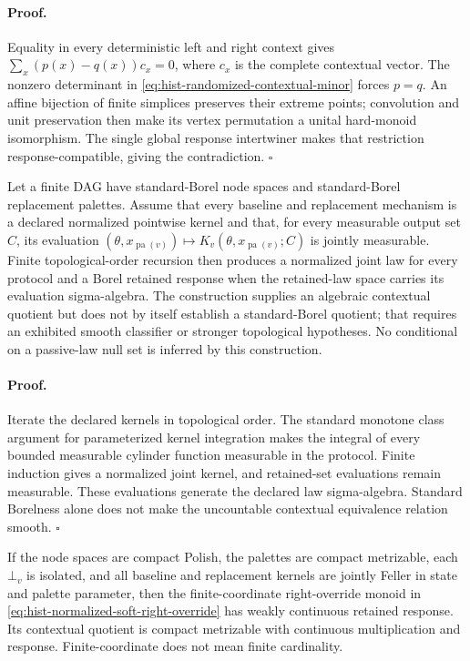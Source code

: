 \paragraph{Proof.}
Equality in every deterministic left and right context gives
\(\sum_x(p(x)-q(x))c_x=0\), where \(c_x\) is the complete contextual vector.
The nonzero determinant in
\eqref{eq:hist-randomized-contextual-minor} forces \(p=q\).  An affine
bijection of finite simplices preserves their extreme points; convolution
and unit preservation then make its vertex permutation a unital hard-monoid
isomorphism.  The single global response intertwiner makes that restriction
response-compatible, giving the contradiction.  \(\square\)

Let a finite DAG have standard-Borel node spaces and standard-Borel
replacement palettes.  Assume that every baseline and replacement mechanism
is a declared normalized pointwise kernel and that, for every measurable
output set \(C\), its evaluation
\((\theta,x_{\operatorname{pa}(v)})\mapsto
K_v(\theta,x_{\operatorname{pa}(v)};C)\) is jointly measurable.  Finite
topological-order recursion then produces a normalized joint law for every
protocol and a Borel retained response when the retained-law space carries
its evaluation sigma-algebra.  The construction supplies an algebraic
contextual quotient but does not by itself establish a standard-Borel
quotient; that requires an exhibited smooth classifier or stronger
topological hypotheses.  No conditional on a passive-law null set is inferred
by this construction.  

\paragraph{Proof.}
Iterate the declared kernels in topological order.  The standard monotone
class argument for parameterized kernel integration makes the integral of
every bounded measurable cylinder function measurable in the protocol.
Finite induction gives a normalized joint kernel, and retained-set
evaluations remain measurable.  These evaluations generate the declared law
sigma-algebra.  Standard Borelness alone does not make the uncountable
contextual equivalence relation smooth.  \(\square\)

If the node spaces are compact Polish, the palettes are compact metrizable,
each \(\bot_v\) is isolated, and all baseline and replacement kernels are
jointly Feller in state and palette parameter, then the finite-coordinate
right-override monoid in
\eqref{eq:hist-normalized-soft-right-override} has weakly continuous retained
response.  Its contextual quotient is compact metrizable with continuous
multiplication and response.  Finite-coordinate does not mean finite
cardinality.  

